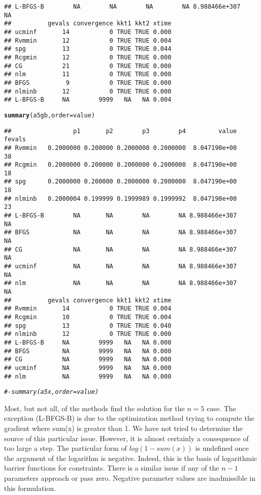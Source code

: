 \documentclass[11pt]{article}\usepackage[]{graphicx}\usepackage[]{color}
\makeatletter
\newcommand{\hlcom}[1]{\textcolor[rgb]{0.678,0.584,0.686}{\textit{#1}}}%
\newcommand{\hlstd}[1]{\textcolor[rgb]{0.345,0.345,0.345}{#1}}%
\newcommand{\hlkwc}[1]{\textcolor[rgb]{0.333,0.667,0.333}{#1}}%
\newcommand{\hlkwd}[1]{\textcolor[rgb]{0.737,0.353,0.396}{\textbf{#1}}}%
\newenvironment{kframe}{%
 \def\at@end@of@kframe{}%
 \ifinner\ifhmode%
  \def\at@end@of@kframe{\end{minipage}}%
  \begin{minipage}{\columnwidth}%
 \fi\fi%
 \def\FrameCommand##1{\hskip\@totalleftmargin \hskip-\fboxsep
 \colorbox{shadecolor}{##1}\hskip-\fboxsep
     \hskip-\linewidth \hskip-\@totalleftmargin \hskip\columnwidth}%
 \MakeFramed {\advance\hsize-\width
   \@totalleftmargin\z@ \linewidth\hsize
   \@setminipage}}%
 {\par\unskip\endMakeFramed%
 \at@end@of@kframe}
\newenvironment{knitrout}{}{} %
\makeatother
\begin{document}
\begin{knitrout}
\begin{kframe}
\begin{verbatim}
## L-BFGS-B        NA        NA        NA        NA 8.988466e+307     NA
##          gevals convergence kkt1 kkt2 xtime
## ucminf       14           0 TRUE TRUE 0.000
## Rvmmin       12           0 TRUE TRUE 0.004
## spg          13           0 TRUE TRUE 0.044
## Rcgmin       12           0 TRUE TRUE 0.000
## CG           21           0 TRUE TRUE 0.000
## nlm          11           0 TRUE TRUE 0.000
## BFGS          9           0 TRUE TRUE 0.000
## nlminb       12           0 TRUE TRUE 0.000
## L-BFGS-B     NA        9999   NA   NA 0.004
\end{verbatim}
\begin{alltt}
\hlkwd{summary}\hlstd{(a5gb,}\hlkwc{order}\hlstd{=value)}
\end{alltt}
\begin{verbatim}
##                 p1       p2        p3        p4         value fevals
## Rvmmin   0.2000000 0.200000 0.2000000 0.2000000  8.047190e+00     38
## Rcgmin   0.2000000 0.200000 0.2000000 0.2000000  8.047190e+00     18
## spg      0.2000000 0.200000 0.2000000 0.2000000  8.047190e+00     18
## nlminb   0.2000004 0.199999 0.1999989 0.1999992  8.047190e+00     23
## L-BFGS-B        NA       NA        NA        NA 8.988466e+307     NA
## BFGS            NA       NA        NA        NA 8.988466e+307     NA
## CG              NA       NA        NA        NA 8.988466e+307     NA
## ucminf          NA       NA        NA        NA 8.988466e+307     NA
## nlm             NA       NA        NA        NA 8.988466e+307     NA
##          gevals convergence kkt1 kkt2 xtime
## Rvmmin       14           0 TRUE TRUE 0.004
## Rcgmin       10           0 TRUE TRUE 0.004
## spg          13           0 TRUE TRUE 0.040
## nlminb       12           0 TRUE TRUE 0.000
## L-BFGS-B     NA        9999   NA   NA 0.000
## BFGS         NA        9999   NA   NA 0.000
## CG           NA        9999   NA   NA 0.000
## ucminf       NA        9999   NA   NA 0.000
## nlm          NA        9999   NA   NA 0.000
\end{verbatim}
\begin{alltt}
\hlcom{#- summary(a5x,order=value)}
\end{alltt}
\end{kframe}
\end{knitrout}

Most, but not all, of the methods find the solution for the $n=5$ case. 
The exception (L-BFGS-B) is due to the optimization method trying to 
compute the gradient where sum(x) is greater than 1. We 
have not tried to determine the source of this particular issue. However, 
it is almost certainly 
a consequence of too large a step. The particular form of $log(1-sum(x))$ 
is undefined once the argument of
the logarithm is negative. Indeed, this is the basis of 
logarithmic barrier functions for constraints. There
is a similar issue if any of the $n-1$ parameters approach or pass zero. Negative 
parameter values are inadmissible in this formulation. 
\end{document}
